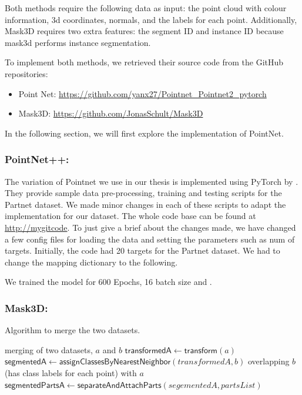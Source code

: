 Both methods require the following data as input: the point cloud with colour information, 3d coordinates, normals, 
and the labels for each point. Additionally, Mask3D requires two extra features: the segment ID and instance ID because 
mask3d performs instance segmentation. 

To implement both methods, we retrieved their source code from the GitHub repositories: 
\begin{itemize}
  \item Point Net:  \url{https://github.com/yanx27/Pointnet_Pointnet2_pytorch} 
  \item Mask3D: \url{https://github.com/JonasSchult/Mask3D} 
\end{itemize}
 
In the following section, we will first explore the implementation of PointNet.

\subsubsection{PointNet++:} 
The variation of Pointnet we use in our thesis is implemented using PyTorch by \citet{Pytorch_Pointnet_Pointnet2}. They provide sample data pre-processing, training and 
testing scripts for the Partnet dataset. We made minor changes in each of these scripts to adapt the implementation for our dataset. The whole code base
can be found at \url{http://mygitcode}. To just give a brief about the changes made, we have changed a few config files for loading the data and setting the
parameters such as num of targets. Initially, the code had 20 targets for the Partnet dataset. We had to change the mapping dictionary to the following. 

We trained the model for 600 Epochs, 16 batch size and .
\subsubsection{Mask3D:}
\begin{Algorithmus} %
  \caption{Algorithm to merge the two datasets.}
  \label{alg:mergeDataset}
  \begin{algorithmic}
     \Comment merging of two datasets, $a$ and $b$
    \State $\mathsf{transformedA} \gets \mathsf{transform}(a) $ 
    \State $\mathsf{segmentedA} \gets \mathsf{assignClassesByNearestNeighbor}(transformedA, b) $ 
    \State \Comment overlapping $b$ (has class labels for each point) with $a$ 
    \State $\mathsf{segmentedPartsA} \gets \mathsf{separateAndAttachParts}(segementedA, partsList)$ 
    \State {}
    \EndProcedure
  \end{algorithmic}
\end{Algorithmus}
